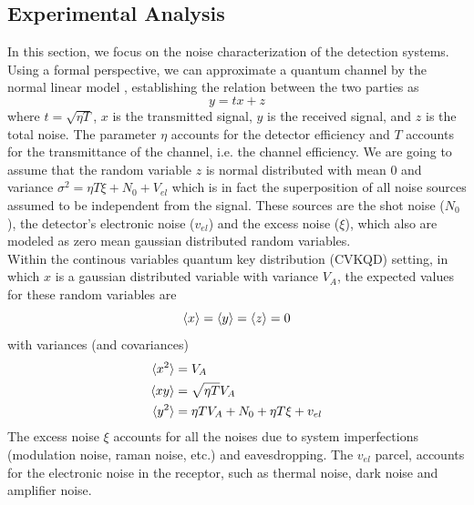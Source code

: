 \subsection{Experimental Analysis}
%
In this section, we focus on the noise characterization of the detection systems.
Using a formal perspective, we can approximate a quantum channel by the normal linear model
\cite{wang2018practical},
establishing the relation between the two parties as
\begin{equation}
	y = tx + z
\end{equation}
where $t=\sqrt{\eta T}$, $x$ is the transmitted signal, $y$ is the received signal, and $z$ is the total noise.
The parameter $\eta$ accounts for the detector efficiency and $T$ accounts for the transmittance of the channel, i.e. the channel efficiency.
We are going to assume that the random variable $z$ is normal distributed with mean $0$ and variance $\sigma^2 = \eta T \xi + N_0 + V_{el}$ which is in fact the superposition of all noise sources assumed to be independent from the signal. 
These sources are the shot noise ($N_0$), the detector's electronic noise ($v_{el}$) and the excess noise ($\xi$), which also are modeled as zero mean gaussian distributed random variables.\\
Within the continous variables quantum key distribution (CVKQD) setting, in which $x$ is a gaussian distributed variable with variance $V_A$, the expected values for these random variables are
\begin{equation}
	\braket{x} = \braket{y} = \braket{z} = 0
\end{equation}
with variances (and covariances)
\begin{equation}
	\begin{aligned}
		\braket{x^2} &= V_A\\
		\braket{xy}  &= \sqrt{\eta T} V_A\\
		\braket{y^2} &= \eta T V_A + N_0 + \eta T \xi + v_{el}\\
	\end{aligned}
\end{equation}
%
The excess noise $\xi$ accounts for all the noises due to system imperfections (modulation noise, raman noise, etc.) and eavesdropping. The $v_{el}$ parcel, accounts for the electronic noise in the receptor, such as thermal noise, dark noise and amplifier noise.\\
%
